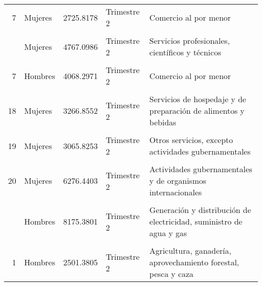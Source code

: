 \documentclass{article}
\begin{document}
\begin{table}[!h]
\begin{tabular}{rlrll}
7 & Mujeres & 2725.8178 & Trimestre 2 & Comercio al por menor\\
\cellcolor{gray!10}{5} & \cellcolor{gray!10}{Mujeres} & \cellcolor{gray!10}{3552.1207} & \cellcolor{gray!10}{Trimestre 2} & \cellcolor{gray!10}{Industrias manufactureras}\\
\addlinespace
12 & Mujeres & 4767.0986 & Trimestre 2 & Servicios profesionales, científicos y técnicos\\
\cellcolor{gray!10}{5} & \cellcolor{gray!10}{Hombres} & \cellcolor{gray!10}{5043.2965} & \cellcolor{gray!10}{Trimestre 2} & \cellcolor{gray!10}{Industrias manufactureras}\\
7 & Hombres & 4068.2971 & Trimestre 2 & Comercio al por menor\\
\cellcolor{gray!10}{14} & \cellcolor{gray!10}{Mujeres} & \cellcolor{gray!10}{3565.9044} & \cellcolor{gray!10}{Trimestre 2} & \cellcolor{gray!10}{Servicios de apoyo a los negocios y manejo de desechos}\\
18 & Mujeres & 3266.8552 & Trimestre 2 & Servicios de hospedaje y de preparación de alimentos y bebidas\\
\addlinespace
\cellcolor{gray!10}{4} & \cellcolor{gray!10}{Hombres} & \cellcolor{gray!10}{5759.1587} & \cellcolor{gray!10}{Trimestre 2} & \cellcolor{gray!10}{Construcción}\\
19 & Mujeres & 3065.8253 & Trimestre 2 & Otros servicios, excepto actividades gubernamentales\\
\cellcolor{gray!10}{6} & \cellcolor{gray!10}{Hombres} & \cellcolor{gray!10}{5371.8625} & \cellcolor{gray!10}{Trimestre 2} & \cellcolor{gray!10}{Comercio al por mayor}\\
20 & Mujeres & 6276.4403 & Trimestre 2 & Actividades gubernamentales y de organismos internacionales\\
\cellcolor{gray!10}{15} & \cellcolor{gray!10}{Mujeres} & \cellcolor{gray!10}{5560.0385} & \cellcolor{gray!10}{Trimestre 2} & \cellcolor{gray!10}{Servicios educativos}\\
\addlinespace
3 & Hombres & 8175.3801 & Trimestre 2 & Generación y distribución de electricidad, suministro de agua y gas\\
\cellcolor{gray!10}{8} & \cellcolor{gray!10}{Hombres} & \cellcolor{gray!10}{5949.0607} & \cellcolor{gray!10}{Trimestre 2} & \cellcolor{gray!10}{Transportes, correos y almacenamiento}\\
1 & Hombres & 2501.3805 & Trimestre 2 & Agricultura, ganadería, aprovechamiento forestal, pesca y caza\\

\end{tabular}
\end{table}
\end{document}
